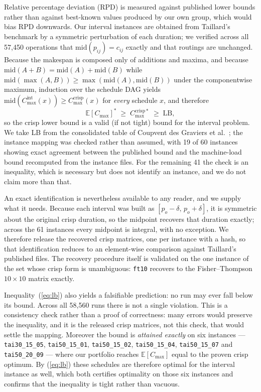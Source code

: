 \documentclass[review]{elsarticle}
\begin{document}
Relative percentage deviation (RPD) is measured against published lower
bounds rather than against best-known values produced by our own group,
which would bias RPD downwards. Our interval instances are obtained from
Taillard's benchmark \cite{taillard1993benchmarks} by a symmetric
perturbation of each duration; we verified across all 57{,}450 operations
that $\mathrm{mid}(p_{ij})=c_{ij}$ exactly and that routings are unchanged.
Because the makespan is composed only of additions and maxima, and because
$\mathrm{mid}(A{+}B)=\mathrm{mid}(A)+\mathrm{mid}(B)$ while
$\mathrm{mid}(\max(A,B))\ge\max(\mathrm{mid}(A),\mathrm{mid}(B))$ under the
componentwise maximum, induction over the schedule DAG yields
$\mathrm{mid}(C_{\max}^{\mathrm{int}}(x))\ge C_{\max}^{\mathrm{crisp}}(x)$
for \emph{every} schedule $x$, and therefore
\begin{equation}\label{eq:lb}
\mathbb{E}[C_{\max}]^{*}\;\ge\;C_{\max}^{\mathrm{crisp}*}\;\ge\;\mathrm{LB},
\end{equation}
so the crisp lower bound is a valid (if not tight) bound for the interval
problem. We take LB from the consolidated table of
Coupvent des Graviers et al.\ \cite{coupvent2025bounds}; the instance
mapping was checked rather than assumed, with 19 of 60 instances showing
exact agreement between the published bound and the machine-load bound
recomputed from the instance files. For the remaining 41 the check is an
inequality, which is necessary but does not identify an instance, and we
do not claim more than that.

An exact identification is nevertheless available to any reader, and we
supply what it needs. Because each interval was built as
$[p_o-\delta,\,p_o+\delta]$, it is symmetric about the original crisp
duration, so the midpoint recovers that duration exactly; across the 61
instances every midpoint is integral, with no exception. We therefore
release the recovered crisp matrices, one per instance with a hash, so that
identification reduces to an element-wise comparison against Taillard's
published files. The recovery procedure itself is validated on the one
instance of the set whose crisp form is unambiguous: \texttt{ft10} recovers
to the Fisher--Thompson $10\times10$ matrix exactly.

Inequality~(\ref{eq:lb}) also yields a falsifiable prediction: no run may
ever fall below its bound. Across all 58{,}560 runs there is not a single
violation. This is a consistency check rather than a proof of correctness:
many errors would preserve the inequality, and it is the released crisp
matrices, not this check, that would settle the mapping. Moreover the bound
is
\emph{attained exactly} on six instances --- \texttt{tai30\_15\_05},
\texttt{tai50\_15\_01}, \texttt{tai50\_15\_02}, \texttt{tai50\_15\_04},
\texttt{tai50\_15\_07} and \texttt{tai50\_20\_09} --- where our portfolio
reaches $\mathbb{E}[C_{\max}]$ equal to the proven crisp optimum. By
(\ref{eq:lb}) these schedules are therefore optimal for the interval
instance as well, which both certifies optimality on those six instances
and confirms that the inequality is tight rather than vacuous.
\end{document}
